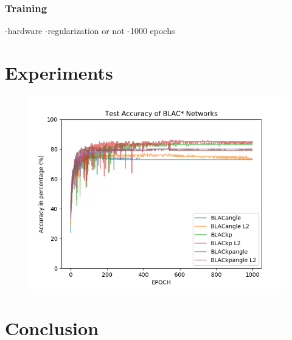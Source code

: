 \documentclass{article}
\begin{document}

\subsubsection{Training}

-hardware
-regularization or not
-1000 epochs

\section{Experiments}

\begin{figure}[h]
\centering
\includegraphics[scale=0.5]{te_acc}
\end{figure}

\section{Conclusion}

%
%
%
%
%
%
\end{document}
